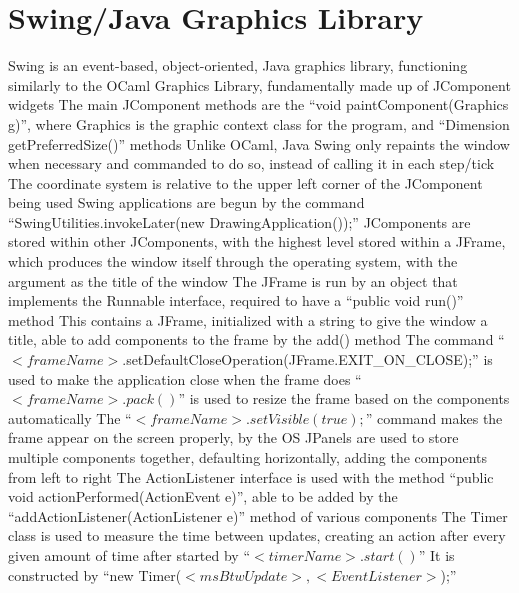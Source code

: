 \documentclass[11 pt, twoside]{article}
\newenvironment{outline*}
{
	\begin{outline}[enumerate]
	}
	{\end{outline}
}
\begin{document}
\section{Swing/Java Graphics Library}
\begin{outline*}
\1 Swing is an event-based, object-oriented, Java graphics library, functioning similarly to the OCaml Graphics Library, fundamentally made up of JComponent widgets
	\2 The main JComponent methods are the ``void paintComponent(Graphics g)'', where Graphics is the graphic context class for the program, and ``Dimension getPreferredSize()'' methods
		\3 Unlike OCaml, Java Swing only repaints the window when necessary and commanded to do so, instead of calling it in each step/tick
	\2 The coordinate system is relative to the upper left corner of the JComponent being used
	\2 Swing applications are begun by the command ``SwingUtilities.invokeLater(new DrawingApplication());''
\1 JComponents are stored within other JComponents, with the highest level stored within a JFrame, which produces the window itself through the operating system, with the argument as the title of the window
	\2 The JFrame is run by an object that implements the Runnable interface, required to have a ``public void run()'' method
	\2 This contains a JFrame, initialized with a string to give the window a title, able to add components to the frame by the add() method
		\3 The command ``$<frameName>$.setDefaultCloseOperation(JFrame.EXIT\_ON\_CLOSE);'' is used to make the application close when the frame does
		\3 ``$<frameName>.pack()$'' is used to resize the frame based on the components automatically
		\3 The ``$<frameName>.setVisible(true);$'' command makes the frame appear on the screen properly, by the OS
	\2 JPanels are used to store multiple components together, defaulting horizontally, adding the components from left to right
\1 The ActionListener interface is used with the method ``public void actionPerformed(ActionEvent e)'', able to be added by the ``addActionListener(ActionListener e)'' method of various components
\1 The Timer class is used to measure the time between updates, creating an action after every given amount of time after started by ``$<timerName>.start()$''
	\2 It is constructed by ``new Timer($<msBtwUpdate>, <EventListener>$);''
\end{outline*}
\end{document}

